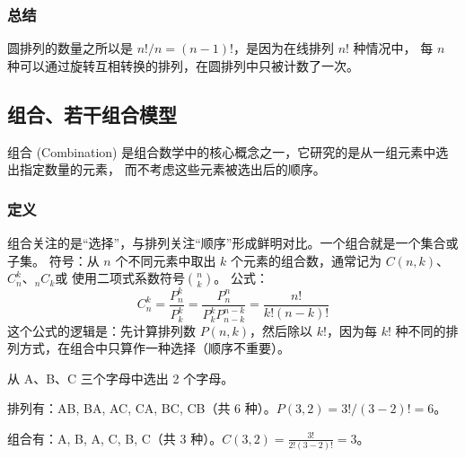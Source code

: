 \subsubsection{总结}
圆排列的数量之所以是 \(n!/n=(n-1)!\)，是因为在线排列 \(n!\) 种情况中，
每 \(n\) 种可以通过旋转互相转换的排列，在圆排列中只被计数了一次。

\subsection{组合、若干组合模型}
\label{sec:combine-and-its-equation}

组合 (Combination) 是组合数学中的核心概念之一，它研究的是从一组元素中选出指定数量的元素，
而不考虑这些元素被选出后的顺序。

\subsubsection{定义}
组合关注的是“选择”，与排列关注“顺序”形成鲜明对比。一个组合就是一个集合或子集。
符号：从 \(n\) 个不同元素中取出 \(k\) 个元素的组合数，通常记为 \(C(n,k)\)、\(C_n^k\)、\({}_nC_k\)或
使用二项式系数符号\(\binom{n}{k}\)。
公式：
\[C_n^k=\frac{P_n^k}{P_k^k}=\frac{P_n^n}{{P_k^k}{P_{n-k}^{n-k}}} = \frac{n!}{k!(n-k)!}\]
这个公式的逻辑是：先计算排列数 \(P(n,k)\)，然后除以 \(k!\)，因为每 \(k!\) 种不同的排列方式，在组合中只算作一种选择（顺序不重要）。

\begin{example}
  从 A、B、C 三个字母中选出 2 个字母。

  排列有：AB, BA, AC, CA, BC, CB（共 6 种）。\(P(3,2) = 3!/(3-2)! = 6\)。

  组合有：{A, B}, {A, C}, {B, C}（共 3 种）。\(C(3,2)=\frac{3!}{2!(3-2)!}=3\)。

\end{example}


